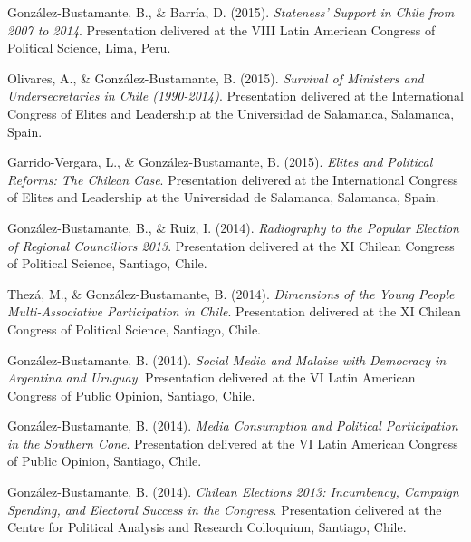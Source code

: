 \begin{publications}
\begin{benumerate}{71}
\item{\small González-Bustamante, B., \& Barría, D. (2015). {\itshape Stateness' Support in Chile from 2007 to 2014}. Presentation delivered at the VIII Latin American Congress of Political Science, Lima, Peru.}\vspace{1mm}

\item{\small Olivares, A., \& González-Bustamante, B. (2015). {\itshape Survival of Ministers and Undersecretaries in Chile (1990-2014)}. Presentation delivered at the International Congress of Elites and Leadership at the Universidad  de Salamanca, Salamanca, Spain.}\vspace{1mm}

\item{\small Garrido-Vergara, L., \& González-Bustamante, B. (2015). {\itshape Elites and Political Reforms: The Chilean Case}. Presentation delivered at the International Congress of Elites and Leadership at the Universidad  de Salamanca, Salamanca, Spain.}\vspace{1mm}

\item{\small González-Bustamante, B., \& Ruiz, I. (2014). {\itshape Radiography to the Popular Election of Regional Councillors 2013}. Presentation delivered at the XI Chilean Congress of Political Science, Santiago, Chile.}\vspace{1mm}

\item{\small Thezá, M., \& González-Bustamante, B. (2014). {\itshape Dimensions of the Young People Multi-Associative Participation in Chile}. Presentation delivered at the XI Chilean Congress of Political Science, Santiago, Chile.}\vspace{1mm}

\item{\small González-Bustamante, B. (2014). {\itshape Social Media and Malaise with Democracy in Argentina and Uruguay}. Presentation delivered at the VI Latin American Congress of Public Opinion, Santiago, Chile.}\vspace{1mm}

\item{\small González-Bustamante, B. (2014). {\itshape Media Consumption and Political Participation in the Southern Cone}. Presentation delivered at the VI Latin American Congress of Public Opinion, Santiago, Chile.}\vspace{1mm}

\item{\small González-Bustamante, B. (2014). {\itshape Chilean Elections 2013: Incumbency, Campaign Spending, and Electoral Success in the Congress}. Presentation delivered at the Centre for Political Analysis and Research Colloquium, Santiago, Chile.}\vspace{1mm}


\end{benumerate}
\end{publications}
